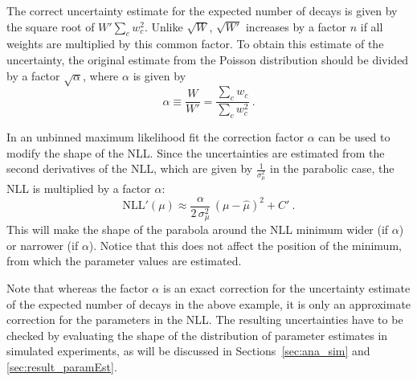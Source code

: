 The correct uncertainty estimate for the expected number of decays is given by the square root of $W'$\textequiv$\sum_c w_c^2$. Unlike
$\sqrt{W}$, $\sqrt{W'}$ increases by a factor $n$ if all weights are multiplied by this common factor. To obtain this estimate of the
uncertainty, the original estimate from the Poisson distribution should be divided by a factor $\sqrt{\alpha}$, where $\alpha$ is given by
\begin{equation}
  \alpha \equiv \frac{W}{W'} = \frac{\sum_c w_c}{\sum_c w_c^2} \ .
\end{equation}

In an unbinned maximum likelihood fit the correction factor $\alpha$ can be used to modify the shape of the NLL. Since the uncertainties
are estimated from the second derivatives of the NLL, which are given by $\frac{1}{\sigma_\mu^2}$ in the parabolic case, the NLL is
multiplied by a factor $\alpha$:
\begin{equation}
  \label{eq:NLLPara_alpha}
  \text{NLL}'(\mu) \approx \frac{\alpha}{2\,\sigma_\mu^2}\, (\mu-\hat{\mu})^2 + C' \ .
\end{equation}
This will make the shape of the parabola around the NLL minimum wider (if $\alpha$) or narrower (if $\alpha$). Notice that
this does not affect the position of the minimum, from which the parameter values are estimated.

Note that whereas the factor $\alpha$ is an exact correction for the uncertainty estimate of the expected number of decays in the above
example, it is only an approximate correction for the parameters in the NLL. The resulting uncertainties have to be checked by evaluating
the shape of the distribution of parameter estimates in simulated experiments, as will be discussed in Sections~\ref{sec:ana_sim} and
\ref{sec:result_paramEst}.
